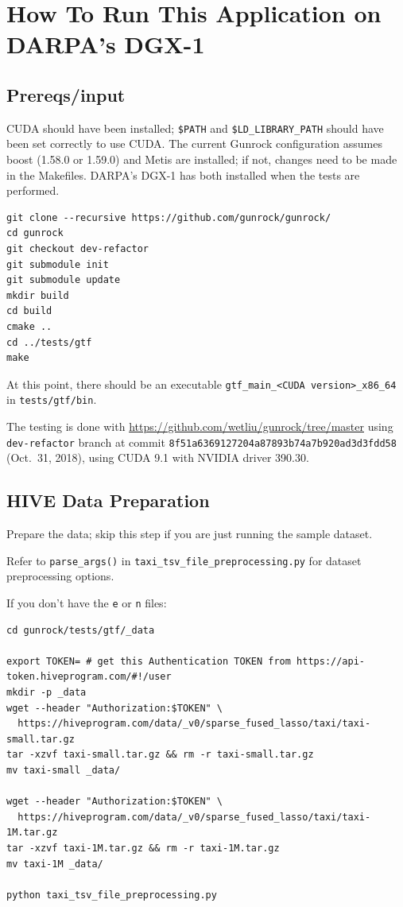 \documentclass[10pt,oneside]{memoir}
\begin{document}
\hypertarget{how-to-run-this-application-on-darpas-dgx-1-8}{%
\section{How To Run This Application on DARPA's
DGX-1}\label{how-to-run-this-application-on-darpas-dgx-1-8}}

\hypertarget{prereqsinput-8}{%
\subsection{Prereqs/input}\label{prereqsinput-8}}

CUDA should have been installed; \texttt{\$PATH} and
\texttt{\$LD\_LIBRARY\_PATH} should have been set correctly to use CUDA.
The current Gunrock configuration assumes boost (1.58.0 or 1.59.0) and
Metis are installed; if not, changes need to be made in the Makefiles.
DARPA's DGX-1 has both installed when the tests are performed.

\begin{verbatim}
git clone --recursive https://github.com/gunrock/gunrock/
cd gunrock
git checkout dev-refactor
git submodule init
git submodule update
mkdir build
cd build
cmake ..
cd ../tests/gtf
make
\end{verbatim}

At this point, there should be an executable
\texttt{gtf\_main\_\textless{}CUDA\ version\textgreater{}\_x86\_64} in
\texttt{tests/gtf/bin}.

The testing is done with
\url{https://github.com/wetliu/gunrock/tree/master} using
\texttt{dev-refactor} branch at commit
\texttt{8f51a6369127204a87893b74a7b920ad3d3fdd58} (Oct.~31, 2018), using
CUDA 9.1 with NVIDIA driver 390.30.

\hypertarget{hive-data-preparation-1}{%
\subsection{HIVE Data Preparation}\label{hive-data-preparation-1}}

Prepare the data; skip this step if you are just running the sample
dataset.

Refer to \texttt{parse\_args()} in
\texttt{taxi\_tsv\_file\_preprocessing.py} for dataset preprocessing
options.

If you don't have the \texttt{e} or \texttt{n} files:

\begin{verbatim}
cd gunrock/tests/gtf/_data

export TOKEN= # get this Authentication TOKEN from https://api-token.hiveprogram.com/#!/user
mkdir -p _data
wget --header "Authorization:$TOKEN" \
  https://hiveprogram.com/data/_v0/sparse_fused_lasso/taxi/taxi-small.tar.gz
tar -xzvf taxi-small.tar.gz && rm -r taxi-small.tar.gz
mv taxi-small _data/

wget --header "Authorization:$TOKEN" \
  https://hiveprogram.com/data/_v0/sparse_fused_lasso/taxi/taxi-1M.tar.gz
tar -xzvf taxi-1M.tar.gz && rm -r taxi-1M.tar.gz
mv taxi-1M _data/

python taxi_tsv_file_preprocessing.py
\end{verbatim}
\end{document}

